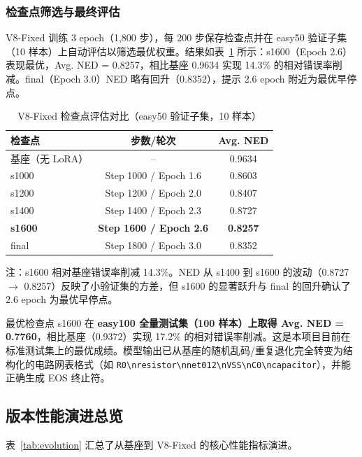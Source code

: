 \subsubsection{检查点筛选与最终评估}

V8-Fixed 训练 3 epoch（1,800 步），每 200 步保存检查点并在 easy50 验证子集（10 样本）上自动评估以筛选最优权重。结果如表~\ref{tab:v8_checkpoints} 所示：s1600（Epoch 2.6）表现最优，Avg. NED = 0.8257，相比基座 0.9634 实现 14.3\% 的相对错误率削减。final（Epoch 3.0）NED 略有回升（0.8352），提示 2.6 epoch 附近为最优早停点。

\begin{table}[h]
\centering
\caption{V8-Fixed 检查点评估对比（easy50 验证子集，10 样本）}
\label{tab:v8_checkpoints}
\begin{tabular}{lcc}
\toprule
\textbf{检查点} & \textbf{步数/轮次} & \textbf{Avg. NED} \\
\midrule
基座（无 LoRA） & --   & 0.9634 \\
s1000  & Step 1000 / Epoch 1.6 & 0.8603 \\
s1200  & Step 1200 / Epoch 2.0 & 0.8407 \\
s1400  & Step 1400 / Epoch 2.3 & 0.8727 \\
\textbf{s1600} & \textbf{Step 1600 / Epoch 2.6} & \textbf{0.8257} \\
final   & Step 1800 / Epoch 3.0 & 0.8352 \\
\bottomrule
\end{tabular}
\par\smallskip
{\small\noindent 注：s1600 相对基座错误率削减 14.3\%。NED 从 s1400 到 s1600 的波动（0.8727 $\to$ 0.8257）反映了小验证集的方差，但 s1600 的显著跃升与 final 的回升确认了 2.6 epoch 为最优早停点。}
\end{table}

最优检查点 s1600 在 \textbf{easy100 全量测试集（100 样本）上取得 Avg. NED = 0.7760}，相比基座（0.9372）实现 17.2\% 的相对错误率削减。这是本项目目前在标准测试集上的最优成绩。模型输出已从基座的随机乱码/重复退化完全转变为结构化的电路网表格式（如 \texttt{R0\textbackslash nresistor\textbackslash nnet012\textbackslash nVSS\textbackslash nC0\textbackslash ncapacitor}），并能正确生成 EOS 终止符。

\subsection{版本性能演进总览}

表~\ref{tab:evolution} 汇总了从基座到 V8-Fixed 的核心性能指标演进。

